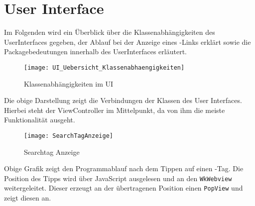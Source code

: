 
\chapter{User Interface}

Im Folgenden wird ein Überblick über die Klassenabhängigkeiten des UserInterfaces gegeben, der Ablauf bei der Anzeige eines \SEARCH-Links erklärt sowie die Packagebedeutungen innerhalb des UserInterfaces erläutert.

\begin{figure}[h]
	\centering
	\texttt{[image: UI\_Uebersicht\_Klassenabhaengigkeiten]}
	\caption{Klassenabhängigkeiten im UI}
\end{figure}

Die obige Darstellung zeigt die Verbindungen der Klassen des User Interfaces. Hierbei steht der ViewController im Mittelpunkt, da von ihm die meiste Funktionalität ausgeht.
\begin{figure}[ht]
	\centering
	\texttt{[image: SearchTagAnzeige]}
	\caption{Searchtag Anzeige}
\end{figure}

Obige Grafik zeigt den Programmablauf nach dem Tippen auf einen \SEARCH-Tag. Die Position des Tipps wird über JavaScript ausgelesen und an den \lstinline|WkWebview| weitergeleitet. Dieser erzeugt an der übertragenen Position einen \lstinline|PopView| und zeigt diesen an. 


\newpage

\newpage

\newpage

\newpage

\newpage


